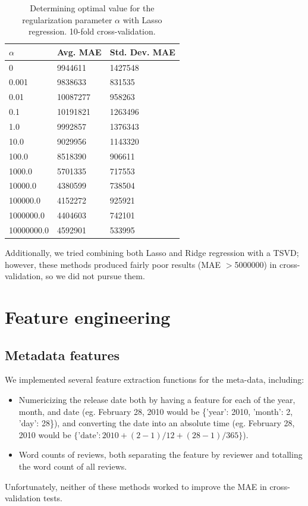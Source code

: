 \documentclass[11pt]{amsart}
\begin{document}
\begin{table}[h]
\begin{tabular}{@{}lll@{}}
\toprule
$\alpha$ & Avg. MAE & Std. Dev. MAE \\ \midrule
  0  & 9944611   & 1427548 \\
                0.001  & 9838633   & 831535  \\
                 0.01  & 10087277  & 958263  \\
                  0.1  & 10191821  & 1263496 \\
                  1.0  & 9992857   & 1376343 \\
                 10.0  & 9029956   & 1143320 \\
                100.0  & 8518390   & 906611  \\
               1000.0  & 5701335   & 717553  \\
              10000.0  & 4380599   & 738504  \\
             100000.0  & 4152272   & 925921  \\
            1000000.0  & 4404603   & 742101  \\
           10000000.0  & 4592901   & 533995  \\\bottomrule
\end{tabular}
\caption{Determining optimal value for the regularization parameter $\alpha$ with Lasso regression. 10-fold cross-validation.}
\end{table}

Additionally, we tried combining both Lasso and Ridge regression with a TSVD; however, these methods produced fairly poor results (MAE $>$5000000) in cross-validation, so we did not pursue them.
\section{Feature engineering}

\subsection{Metadata features}
We implemented several feature extraction functions for the meta-data, including:
\begin{itemize}
	\item Numericizing the release date both by having a feature for each of the year, month, and date (eg. February 28, 2010 would be \{'year': 2010, 'month': 2, 'day': 28\}), and converting the date into an absolute time (eg. February 28, 2010 would be $\{\text{'date'}: 2010 + (2-1)/12 + (28-1)/365\}$).
	\item Word counts of reviews, both separating the feature by reviewer and totalling the word count of all reviews.
\end{itemize}
Unfortunately, neither of these methods worked to improve the MAE in cross-validation tests.
\end{document}

